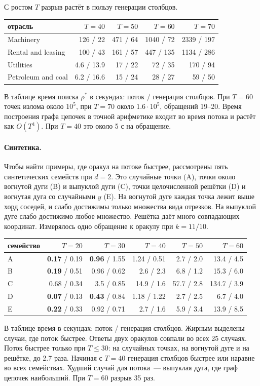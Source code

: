 \documentclass[a4paper,11pt]{article}
\theoremstyle{plain}
\theoremstyle{definition}
\theoremstyle{remark}
\begin{document}
С ростом $T$ разрыв растёт в пользу генерации столбцов.
\begin{center}
\begin{tabular}{lrrrr}
    \toprule
    отрасль & $T=40$ & $T=50$ & $T=60$ & $T=70$ \\
    \midrule
    Machinery & 126 / 22 & 471 / 64 & 1040 / 72 & 2339 / 197 \\
    Rental and leasing & 100 / 43 & 161 / 57 & 447 / 135 & 1134 / 286 \\
    Utilities & 4.6 / 13.9 & 17 / 22 & 72 / 35 & 170 / 94 \\
    Petroleum and coal & 6.2 / 16.6 & 15 / 24 & 28 / 27 & 59 / 50 \\
    \bottomrule
\end{tabular}
\end{center}
В таблице время поиска $\rho^*$ в секундах: поток / генерация столбцов. При $T=60$ точек излома около $10^5$, при $T=70$ около $1.6\cdot10^5$, обращений 19--20. Время построения графа цепочек в точной арифметике входит во время потока и растёт как $O(T^4)$. При $T=40$ это около 5 с на обращение.

\paragraph{Синтетика.} Чтобы найти примеры, где оракул на потоке быстрее, рассмотрены пять синтетических семейств при $d=2$. Это случайные точки (A), точки около вогнутой дуги (B) и выпуклой дуги (C), точки целочисленной решётки (D) и вогнутая дуга со случайными $y$ (E). На вогнутой дуге каждая точка лежит выше хорд соседей, и слабо достижимы только множества вида отрезков. На выпуклой дуге слабо достижимо любое множество. Решётка даёт много совпадающих координат. Измерялось одно обращение к оракулу при $k=11/10$.
\begin{center}
\begin{tabular}{lrrrrr}
    \toprule
    семейство & $T=20$ & $T=30$ & $T=40$ & $T=50$ & $T=60$ \\
    \midrule
    A & \textbf{0.17} / 0.19 & \textbf{0.96} / 1.55 & 1.24 / 0.51 & 2.7 / 2.0 & 13.4 / 4.5 \\
    B & \textbf{0.19} / 0.51 & 0.96 / 0.62 & 2.6 / 2.3 & 6.8 / 1.2 & 15.3 / 6.0 \\
    C & 0.68 / 0.34 & 3.5 / 0.85 & 14.9 / 1.6 & 57.7 / 2.8 & 134.7 / 3.9 \\
    D & \textbf{0.07} / 0.13 & \textbf{0.43} / 0.84 & 1.18 / 1.22 & 2.7 / 2.5 & 6.7 / 4.0 \\
    E & \textbf{0.22} / 0.33 & 0.92 / 0.71 & 2.7 / 1.6 & 5.9 / 3.4 & 13.9 / 8.5 \\
    \bottomrule
\end{tabular}
\end{center}
В таблице время в секундах: поток / генерация столбцов. Жирным выделены случаи, где поток быстрее. Ответы двух оракулов совпали во всех 25 случаях. Поток быстрее только при $T\le30$: на случайных точках, на вогнутой дуге и на решётке, до 2.7 раза. Начиная с $T=40$ генерация столбцов быстрее или наравне во всех семействах. Худший случай для потока~--- выпуклая дуга, где граф цепочек наибольший. При $T=60$ разрыв 35 раз.
\end{document}
